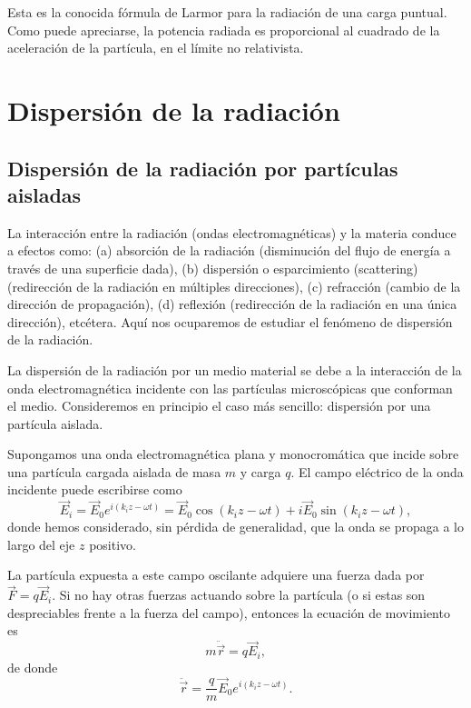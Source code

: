 \documentclass[12pt,a4paper]{book}
\begin{document}
Esta es la conocida fórmula de Larmor para la radiación de una carga puntual. Como puede apreciarse, la potencia radiada es proporcional al cuadrado de la aceleración de la partícula, en el límite no relativista.

\section{Dispersión de la radiación}

\subsection{Dispersión de la radiación por partículas aisladas}

La interacción entre la radiación (ondas electromagnéticas) y la materia conduce a efectos como: (a) absorción de la radiación (disminución del flujo de energía a través de una superficie dada), (b) dispersión o esparcimiento (scattering) (redirección de la radiación en múltiples direcciones), (c) refracción (cambio de la dirección de propagación), (d) reflexión (redirección de la radiación en una única dirección), etcétera. Aquí nos ocuparemos de estudiar el fenómeno de dispersión de la radiación.

La dispersión de la radiación por un medio material se debe a la interacción de la onda electromagnética incidente con las partículas microscópicas que conforman el medio. Consideremos en principio el caso más sencillo: dispersión por una partícula aislada.

Supongamos una onda electromagnética plana y monocromática que incide sobre una partícula cargada aislada de masa $m$ y carga $q$. El campo eléctrico de la onda incidente puede escribirse como
\begin{equation}
\vec{E}_i = \vec{E}_0e^{i(k_iz-\omega t)} = \vec{E}_0\cos(k_iz-\omega t) + i\vec{E}_0\sin(k_iz-\omega t),
\end{equation}
donde hemos considerado, sin pérdida de generalidad, que la onda se propaga a lo largo del eje $z$ positivo.

La partícula expuesta a este campo oscilante adquiere una fuerza dada por $\vec{F} = q\vec{E}_i$. Si no hay otras fuerzas actuando sobre la partícula (o si estas son despreciables frente a la fuerza del campo), entonces la ecuación de movimiento es
\begin{equation}
m\ddot{\vec{r}} = q\vec{E}_i,
\end{equation}
de donde
\begin{equation}
\ddot{\vec{r}} = \frac{q}{m}\vec{E}_0e^{i(k_iz-\omega t)}.
\end{equation}
\end{document}
